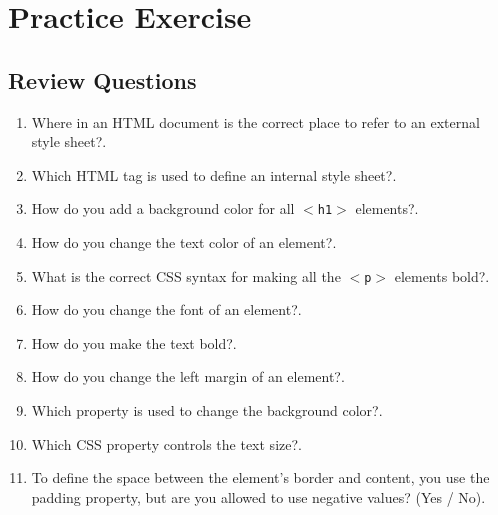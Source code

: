 \documentclass[11pt,a4paper]{article}
\begin{document}
\section*{Practice Exercise}
\subsection*{Review Questions}
\begin{enumerate}\itemsep10pt
\item Where in an HTML document is the correct place to refer to an external style sheet?\underline{\hspace{3cm}}.

\item Which HTML tag is used to define an internal style sheet?\underline{\hspace{3cm}}.

\item How do you add a background color for all \texttt{$<$h1$>$} elements?\underline{\hspace{3cm}}.

\item How do you change the text color of an element?\underline{\hspace{3cm}}.

\item What is the correct CSS syntax for making all the \texttt{$<$p$>$} elements bold?\underline{\hspace{3cm}}.

\item How do you change the font of an element?\underline{\hspace{3cm}}.

\item How do you make the text bold?\underline{\hspace{3cm}}.

\item How do you change the left margin of an element?\underline{\hspace{3cm}}.

\item Which property is used to change the background color?\underline{\hspace{3cm}}.

\item Which CSS property controls the text size?\underline{\hspace{3cm}}.

\item To define the space between the element's border and content, you use the padding property, but are you allowed to use negative values? (Yes / No)\underline{\hspace{3cm}}.


\end{enumerate}
\end{document}
